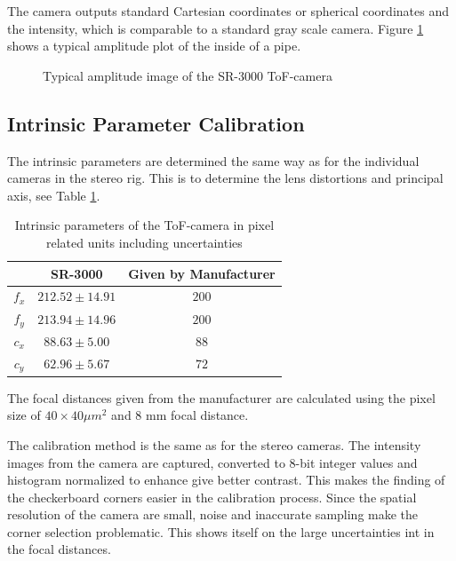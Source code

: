 The camera outputs standard Cartesian coordinates or spherical coordinates and the
intensity, which is comparable to a standard gray scale camera. Figure 
\ref{chap3:fig-tof-amppicture} shows a typical amplitude plot of the inside of a pipe.
\begin{figure}[htbp]
    \centering
    \caption{Typical amplitude image of the SR-3000 ToF-camera}
    \label{chap3:fig-tof-amppicture}
\end{figure}


\subsection{Intrinsic Parameter Calibration}
The intrinsic parameters are determined the same way as for the individual cameras in the
stereo rig. This is to determine the lens distortions and principal axis, see Table
\ref{chap3:tab-intrinsic-sr3000}.
\begin{table}[htbp]
  \centering
    \begin{tabular}{|c|c|c|} 
        \hline
                & SR-3000       & Given by Manufacturer \\
        \hline
        $f_x$   & $212.52 \pm 14.91 $  & $200$  \\
        $f_y$   & $213.94 \pm 14.96 $  & $200$  \\
        \hline
        $c_x$   & $88.63 \pm 5.00$  & $88$ \\
        $c_y$   & $ 62.96 \pm 5.67 $ & $72$  \\
        \hline
    \end{tabular}
    \caption{Intrinsic parameters of the ToF-camera in pixel related units including
    uncertainties}
    \label{chap3:tab-intrinsic-sr3000}
\end{table}
The focal distances given from the manufacturer are calculated using the pixel size of
$40 \times 40 \mu m^2$ and 8 mm focal distance.

The calibration method is the same as for the stereo cameras. The intensity images from
the camera are captured, converted to 8-bit integer values and histogram normalized to
enhance give better contrast. This makes the finding of the checkerboard corners easier in
the calibration process. Since the spatial resolution of the camera are small, noise and
inaccurate sampling make the corner selection problematic. This shows itself on the large
uncertainties int in the focal distances. 

